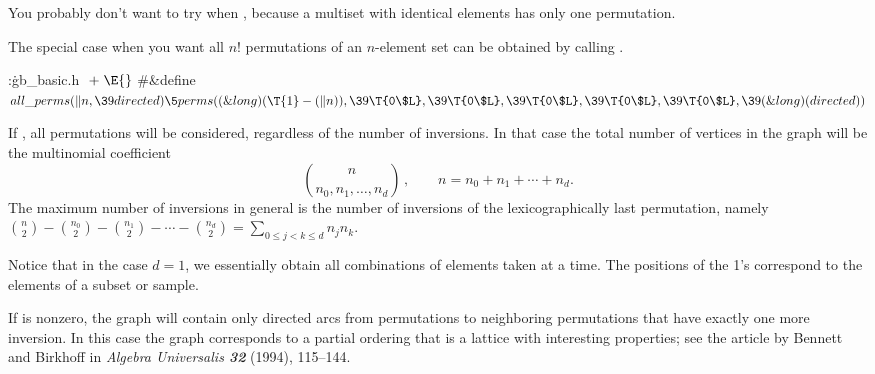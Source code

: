You probably don't want to try 
when , because a multiset with  identical
elements has only
one permutation.

The special case when you want all $n!$ permutations of an $n$-element set
can be obtained by calling .

\Y\B\4:\.{gb\_basic.h }\X${}\mathrel+\E{}$\6
\8\#\&{define} ${}\\{all\_perms}(\|n,\39\\{directed}) \5\\{perms}((\&{long})(%
\T{1}-(\|n)),\39\T{0\$L},\39\T{0\$L},\39\T{0\$L},\39\T{0\$L},\39\T{0\$L},\39(%
\&{long})(\\{directed})){}$\par
\fi

If , all permutations will be considered,
regardless of
the number of inversions. In that case the total number of vertices in
the graph will be the multinomial coefficient $${n\choose
n_0,n_1,\ldots,n_d}\,,\qquad n=n_0+n_1+\cdots+n_d.$$ The maximum
number of inversions in general is the number of inversions of the
lexicographically last permutation, namely ${n\choose2}-{n_0\choose2}-
{n_1\choose2}-\cdots-{n_d\choose2}=\sum_{0\le j<k\le d}n_jn_k$.

\vskip1pt
Notice that in the case $d=1$, we essentially obtain all combinations of
 elements taken  at a time. The positions of the
1's correspond
to the elements of a subset or sample.

If  is nonzero, the graph will contain only directed arcs
from permutations to neighboring permutations that have exactly one more
inversion. In this case the graph corresponds to a partial ordering that is a
lattice with interesting properties; see the article by Bennett and Birkhoff
in {\sl Algebra Universalis\/ \bf32} (1994), 115--144.

